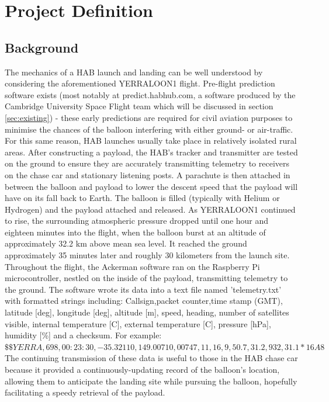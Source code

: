 \documentclass[11pt]{article}
\begin{document}
\section{Project Definition}

\subsection{Background}

The mechanics of a HAB launch and landing can be well understood by considering the aforementioned YERRALOON1 flight. Pre-flight prediction software exists (most notably at predict.habhub.com, a software produced by the Cambridge University Space Flight team which will be discussed in section \ref{sec:existing}) - these early predictions are required for civil aviation purposes to minimise the chances of the balloon interfering with either ground- or air-traffic. For this same reason, HAB launches usually take place in relatively isolated rural areas. After constructing a payload, the HAB's tracker and transmitter are tested on the ground to ensure they are accurately transmitting telemetry to receivers on the chase car and stationary listening posts. A parachute is then attached in between the balloon and payload to lower the descent speed that the payload will have on its fall back to Earth. The balloon is filled (typically with Helium or Hydrogen) and the payload attached and released. As YERRALOON1 continued to rise, the surrounding atmospheric pressure dropped until one hour and eighteen minutes into the flight, when the balloon burst at an altitude of approximately 32.2 km above mean sea level. It reached the ground approximately 35 minutes later and roughly 30 kilometers from the launch site. \\

Throughout the flight, the Ackerman software ran on the Raspberry Pi microcontroller, nestled on the inside of the payload, transmitting telemetry to the ground. The software wrote its data into a text file named 'telemetry.txt' with formatted strings including: Callsign,packet counter,time stamp (GMT), latitude [deg], longitude [deg], altitude [m], speed, heading, number of satellites visible, internal temperature [C], external temperature [C], pressure [hPa], humidity [\%] and a checksum. For example: \\
 $ \$ \$YERRA,698,00:23:30,-35.32110,149.00710,00747,11,16,9,50.7,31.2,932,31.1*16A8$
The continuing transmission of these data is useful to those in the HAB chase car because it provided a continuously-updating record of the balloon's location, allowing them to anticipate the landing site while pursuing the balloon, hopefully facilitating a speedy retrieval of the payload.
\end{document}
